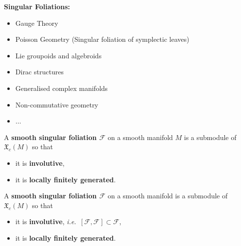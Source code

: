 \documentclass[
aspectratio=3218, 
10pt
]{beamer}
\theoremstyle{plain}
\theoremstyle{remark}
\begin{document}
{
\begin{frame}
\textbf{Singular Foliations:}

\begin{itemize}
	\item Gauge Theory
	\item Poisson Geometry \newline (Singular foliation of symplectic leaves)
	\item Lie groupoids and algebroids
	\item Dirac structures
	\item Generalised complex manifolds
	\item Non-commutative geometry
	\item $\dotsc$
\end{itemize}

\end{frame}
}


\begin{frame}
\begin{definition}\vspace{.5pt}
A \textbf{smooth singular foliation $\mathcal{F}$} on a smooth manifold $M$ is a submodule of $\mathfrak{X}_c(M)$ so that
\begin{itemize}
	\item it is \textbf{involutive},
	\item it is \textbf{locally finitely generated}.
\end{itemize}
\end{definition}
\end{frame}

\begin{frame}
\begin{definition}\vspace{.5pt}
A \textbf{smooth singular foliation $\mathcal{F}$} on a smooth manifold is a submodule of $\mathfrak{X}_c(M)$ so that
\begin{itemize}
	\item it is \textbf{involutive}, \textit{i.e.\ $[\mathcal{F}, \mathcal{F}] \subset \mathcal{F}$},
	\item it is \textbf{locally finitely generated}.
\end{itemize}
\end{definition}
\end{frame}
\end{document}
